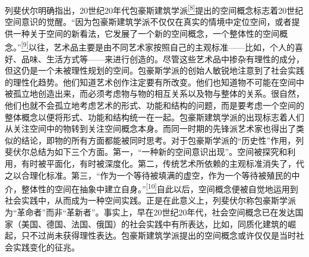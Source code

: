 \documentclass[UTF8, fontset = sourcesans, a4paper, oneside, zihao =
-4, scheme=chinese, no-math, space=true]{ctexbook}
\begin{document}
列斐伏尔明确指出，20世纪20年代包豪斯建筑学派\protect\hypertarget{part0006_split_001.htmlux5cux23w8}{}{}\protect\hyperlink{part0006_split_003.htmlux5cux23m8}{\textsuperscript{{[}8{]}}}提出的空间概念标志着20世纪空间意识的觉醒。``因为包豪斯建筑学派不仅仅在真实的情境中定位空间，或者提供一种关于空间的新看法，它发展了一个新的空间概念，一个整体性的空间概念。''\protect\hypertarget{part0006_split_001.htmlux5cux23w9}{}{}\protect\hyperlink{part0006_split_003.htmlux5cux23m9}{\textsuperscript{{[}9{]}}}以往，艺术品主要是由不同艺术家按照自己的主观标准------比如，个人的喜好、品味、生活方式等------来进行创造的。尽管这些艺术品中掺杂有理性的成分，但这仍是一个未被理性规划的空间。包豪斯学派的创始人敏锐地注意到了社会实践的理性化趋势。他们知道艺术创作注定要有所改变。他们也知道物不可能在空间中被孤立地创造出来，而必须考虑物与物的相互关系以及物与整体的关系。很自然，他们也就不会孤立地考虑艺术的形式、功能和结构的问题，而是要考虑一个空间的整体概念以便将形式、功能和结构统一在一起。包豪斯建筑学派的出现标志着人们从关注空间中的物转到关注空间概念本身。而同一时期的先锋派艺术家也得出了类似的结论，即物的所有方面都能被同时思考。对于包豪斯学派的``历史性''作用，列斐伏尔总结为如下三个方面。第一，``一种新的空间意识出现''。空间被探究和利用，有时被平面化，有时被深度化。第二，传统艺术所依赖的主观标准消失了，代之以合理化标准。第三，``作为一个等待被填满的虚空，作为一个等待被殖民的中介，整体性的空间在抽象中建立自身。''\protect\hypertarget{part0006_split_001.htmlux5cux23w10}{}{}\protect\hyperlink{part0006_split_003.htmlux5cux23m10}{\textsuperscript{{[}10{]}}}自此以后，空间概念便被自觉地运用到社会实践中，从而成为一种空间实践。正是在此意义上，列斐伏尔称包豪斯学派为``革命者''而非``革新者''。事实上，早在20世纪20年代，社会空间概念已在发达国家（美国、德国、法国、俄国）的社会实践中有所表达，比如，同质化建筑的崛起，只不过尚未获得理性表达。包豪斯建筑学派提出的空间概念或许仅仅是当时社会实践变化的征兆。
\end{document}
